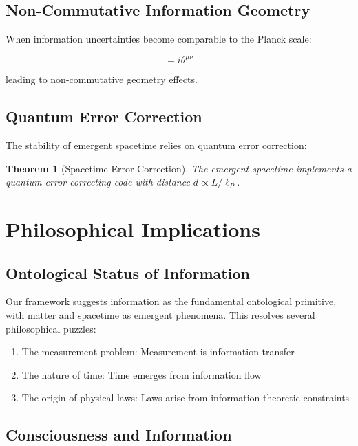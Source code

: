 \documentclass[12pt,a4paper]{article}
\newtheorem{theorem}{Theorem}[section]
\begin{document}
\subsection{Non-Commutative Information Geometry}

When information uncertainties become comparable to the Planck scale:

\begin{equation}
[X^\mu, X^\nu] = i\theta^{\mu\nu}
\end{equation}

leading to non-commutative geometry effects.

\subsection{Quantum Error Correction}

The stability of emergent spacetime relies on quantum error correction:

\begin{theorem}[Spacetime Error Correction]
The emergent spacetime implements a quantum error-correcting code with distance $d \propto L/\ell_P$.
\end{theorem}

\section{Philosophical Implications}

\subsection{Ontological Status of Information}

Our framework suggests information as the fundamental ontological primitive, with matter and spacetime as emergent phenomena. This resolves several philosophical puzzles:

\begin{enumerate}
\item The measurement problem: Measurement is information transfer
\item The nature of time: Time emerges from information flow
\item The origin of physical laws: Laws arise from information-theoretic constraints
\end{enumerate}

\subsection{Consciousness and Information}
\end{document}
